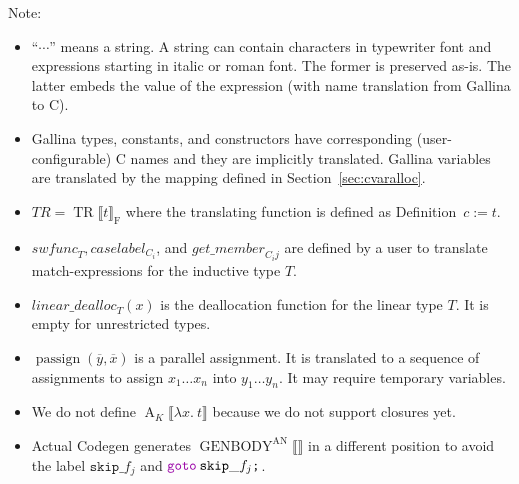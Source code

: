 \documentclass[a4paper,fleqn]{article}
\def\gallina{\textrm{Gallina}}
\def\codegen{\textrm{Codegen}}
\newcommand{\kwDefinition}{\mbox{\color{myviolet}\ttfamily Definition}}
\newcommand{\kwmatch}{\mbox{\color{mygreen}\ttfamily match}}
\newcommand{\lam}[2]{\lambda #1.\:#2}
\newcommand{\BRA}[1]{\llbracket #1 \rrbracket}
\DeclareMathOperator{\genbody}{GENBODY}
\newcommand{\genbodyan}[1]{\genbody^\mathrm{AN}\BRA{#1}}
\DeclareMathOperator{\TRop}{TR}
\newcommand{\TR}[2]{\TRop\BRA{#1}_{#2}}
\newcommand{\tr}{\mathit{TR}}
\newcommand{\false}{\mathrm{F}}
\newcommand{\dq}[1]{\text{``}#1\text{''}}
\newcommand{\ttsemi}{\texttt{;}}
\newcommand{\kwgoto}{\mbox{\color{myviolet}\ttfamily goto}}
\newcommand{\secref}[1]{Section~\ref{#1}}
\DeclareMathOperator{\passign}{passign}
\DeclareMathOperator{\Aop}{A}
\newcommand{\A}[2]{\Aop_{#1}\BRA{#2}}
\newcommand{\rep}[1]{\overline{#1}}
\begin{document}
{\small Note:
\begin{itemize}
  \item $\dq{\cdots}$ means a string.
    A string can contain characters in typewriter font and expressions starting in italic or roman font.
    The former is preserved as-is.
    The latter embeds the value of the expression (with name translation from \gallina{} to C).
  \item \gallina{} types, constants, and constructors have corresponding (user-configurable) C names and they are implicitly translated.
    \gallina{} variables are translated by the mapping defined in \secref{sec:cvaralloc}.
  \item $\tr = \TR{t}{\false}$ where the translating function is defined as \kwDefinition~$c := t$.
  \item $\mathit{swfunc}_T, \mathit{caselabel}_{C_i}$, and $\mathit{get\_member}_{C_i j}$ are defined by a user to translate \kwmatch-expressions for the inductive type $T$.
  \item $\mathit{linear\_dealloc}_{T}(x)$ is the deallocation function for the linear type $T$.  It is empty for unrestricted types.
  \item $\passign(\rep{y}, \rep{x})$ is a parallel assignment. It is translated to a sequence of assignments to assign $x_1\ldots x_n$ into $y_1\ldots y_n$.  It may require temporary variables.
  \item We do not define $\A{K}{\lam{x}{t}}$ because we do not support closures yet.
  \item Actual \codegen{} generates $\genbodyan{}$ in a different position to avoid the label $\mathtt{skip\_}f_j$ and $\kwgoto\:\mathtt{skip\_}f_j\ttsemi$.
\end{itemize}}
\end{document}
